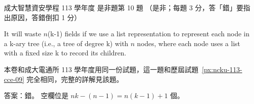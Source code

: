 \begin{pastexam}[label={px:ncku-113-isec-09}]{成大智慧資安學程 113 學年度 是非題第 10 題}
（是非；每題 3 分，答「錯」要指出原因，答錯倒扣 1 分）

It will waste $n$(k-1) fields if we use a list representation to represent each node in a k-ary
tree (i.e., a tree of degree k) with $n$ nodes, where each node uses a list with a fixed size k to
record its children.
\end{pastexam}

\begin{pastsoln}
本卷和成大電通所 113 學年度用同一份試題，這一題和歷屆試題~\ref{px:ncku-113-cce-09} 完全相同，完整的詳解見該題。

答案：錯。 空欄位是 $nk - (n - 1) = n(k - 1) + 1$ 個。
\end{pastsoln}
